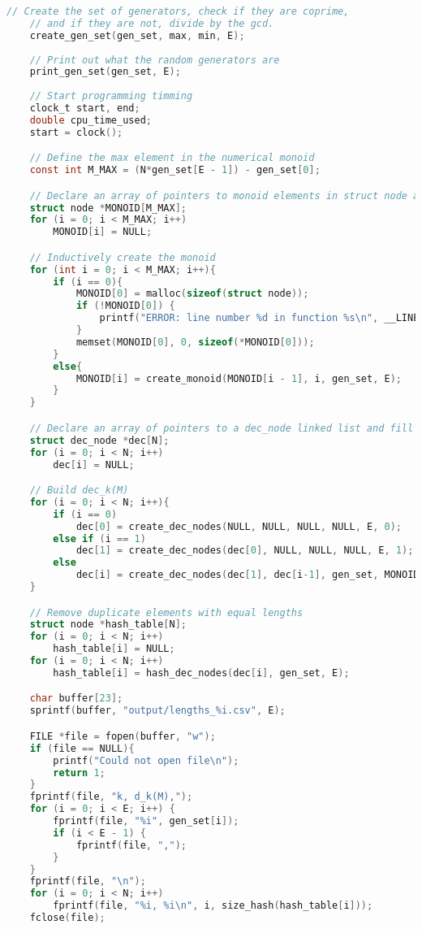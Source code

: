 \begin{lstlisting}[language=C]
    // Create the set of generators, check if they are coprime,
    // and if they are not, divide by the gcd.
    create_gen_set(gen_set, max, min, E);
    
    // Print out what the random generators are
    print_gen_set(gen_set, E);
    
    // Start programming timming
    clock_t start, end;
    double cpu_time_used;
    start = clock();

    // Define the max element in the numerical monoid
    const int M_MAX = (N*gen_set[E - 1]) - gen_set[0];

    // Declare an array of pointers to monoid elements in struct node and fill with NULL
    struct node *MONOID[M_MAX];
    for (i = 0; i < M_MAX; i++) 
        MONOID[i] = NULL;

    // Inductively create the monoid
    for (int i = 0; i < M_MAX; i++){
        if (i == 0){
            MONOID[0] = malloc(sizeof(struct node));
            if (!MONOID[0]) {
                printf("ERROR: line number %d in function %s\n", __LINE__, __func__);
            }
            memset(MONOID[0], 0, sizeof(*MONOID[0]));
        }
        else{
            MONOID[i] = create_monoid(MONOID[i - 1], i, gen_set, E);
        }
    }

    // Declare an array of pointers to a dec_node linked list and fill with NULL
    struct dec_node *dec[N];
    for (i = 0; i < N; i++) 
        dec[i] = NULL;

    // Build dec_k(M)
    for (i = 0; i < N; i++){
        if (i == 0)
            dec[0] = create_dec_nodes(NULL, NULL, NULL, NULL, E, 0);
        else if (i == 1)
            dec[1] = create_dec_nodes(dec[0], NULL, NULL, NULL, E, 1);
        else
            dec[i] = create_dec_nodes(dec[1], dec[i-1], gen_set, MONOID, E, i);
    }

    // Remove duplicate elements with equal lengths
    struct node *hash_table[N];
    for (i = 0; i < N; i++) 
        hash_table[i] = NULL;
    for (i = 0; i < N; i++)
        hash_table[i] = hash_dec_nodes(dec[i], gen_set, E);

    char buffer[23];
    sprintf(buffer, "output/lengths_%i.csv", E);

    FILE *file = fopen(buffer, "w");
    if (file == NULL){
        printf("Could not open file\n");
        return 1;
    }
    fprintf(file, "k, d_k(M),");
    for (i = 0; i < E; i++) {
        fprintf(file, "%i", gen_set[i]);
        if (i < E - 1) {
            fprintf(file, ",");
        }
    }
    fprintf(file, "\n");
    for (i = 0; i < N; i++)
        fprintf(file, "%i, %i\n", i, size_hash(hash_table[i]));
    fclose(file);


\end{lstlisting}
